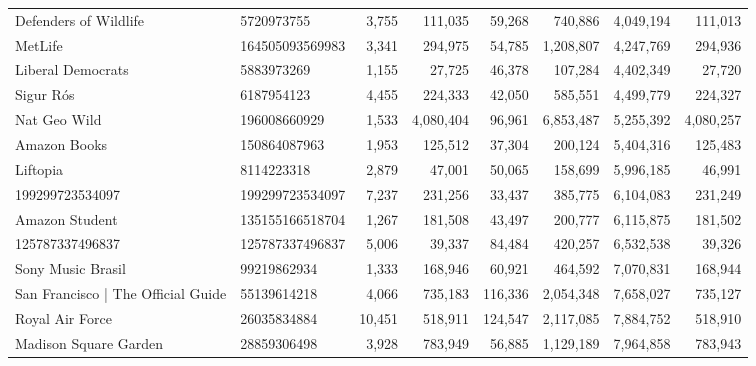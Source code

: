 \begin{longtable}{llrrrrrr}
                             Defenders of Wildlife &       5720973755 &   3,755 &     111,035 &     59,268 &     740,886 &     4,049,194 &    111,013 \\
                                           MetLife &  164505093569983 &   3,341 &     294,975 &     54,785 &   1,208,807 &     4,247,769 &    294,936 \\
                                 Liberal Democrats &       5883973269 &   1,155 &      27,725 &     46,378 &     107,284 &     4,402,349 &     27,720 \\
                                         Sigur Rós &       6187954123 &   4,455 &     224,333 &     42,050 &     585,551 &     4,499,779 &    224,327 \\
                                      Nat Geo Wild &     196008660929 &   1,533 &   4,080,404 &     96,961 &   6,853,487 &     5,255,392 &  4,080,257 \\
                                      Amazon Books &     150864087963 &   1,953 &     125,512 &     37,304 &     200,124 &     5,404,316 &    125,483 \\
                                          Liftopia &       8114223318 &   2,879 &      47,001 &     50,065 &     158,699 &     5,996,185 &     46,991 \\
                                   199299723534097 &  199299723534097 &   7,237 &     231,256 &     33,437 &     385,775 &     6,104,083 &    231,249 \\
                                    Amazon Student &  135155166518704 &   1,267 &     181,508 &     43,497 &     200,777 &     6,115,875 &    181,502 \\
                                   125787337496837 &  125787337496837 &   5,006 &      39,337 &     84,484 &     420,257 &     6,532,538 &     39,326 \\
                                 Sony Music Brasil &      99219862934 &   1,333 &     168,946 &     60,921 &     464,592 &     7,070,831 &    168,944 \\
                San Francisco | The Official Guide &      55139614218 &   4,066 &     735,183 &    116,336 &   2,054,348 &     7,658,027 &    735,127 \\
                                   Royal Air Force &      26035834884 &  10,451 &     518,911 &    124,547 &   2,117,085 &     7,884,752 &    518,910 \\
                             Madison Square Garden &      28859306498 &   3,928 &     783,949 &     56,885 &   1,129,189 &     7,964,858 &    783,943 \\

\end{longtable}
